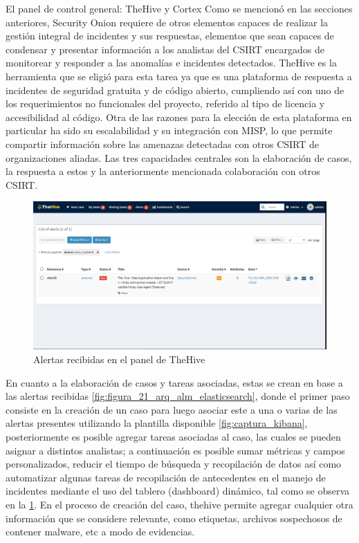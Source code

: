    \begin{subsection}{El panel de control general: TheHive y Cortex}
     Como se mencionó en las secciones anteriores, Security Onion requiere de otros elementos capaces de realizar la gestión integral de incidentes y sus respuestas, elementos que sean capaces de condensar y presentar información a los analistas del CSIRT encargados de monitorear y responder a las anomalías e incidentes detectados.  TheHive es la herramienta que se eligió para esta tarea ya que es una plataforma de respuesta a incidentes de seguridad gratuita y de código abierto, cumpliendo así con uno de los requerimientos no funcionales del proyecto, referido al tipo de licencia y accesibilidad al código. Otra de las razones para la elección de esta plataforma en particular ha sido su escalabilidad y su integración con MISP, lo que permite compartir información sobre las amenazas detectadas con otros CSIRT de organizaciones aliadas. Las tres capacidades centrales son la elaboración de casos, la respuesta a estos y la anteriormente mencionada colaboración con otros CSIRT.\par
     \begin{figure}[H]
        \centering
        \includegraphics[width=1\textwidth]{./iteracion_1_imagenes/figura_23_alerta_panel_thehive.png}
        \caption{ Alertas recibidas en el panel de TheHive\cite{thehive}}
        \label{fig:alerta_panel_thehive}
     \end{figure}
        \FloatBarrier
        En cuanto a la elaboración de casos y tareas asociadas, estas se crean en base a las alertas recibidas \ref{fig:figura_21_arq_alm_elasticsearch}, donde el primer paso consiste en la creación de un caso para luego asociar este a una o varias de las alertas presentes utilizando la plantilla disponible \ref{fig:captura_kibana}, posteriormente es posible agregar tareas asociadas al caso, las cuales se pueden asignar a distintos analistas; a continuación es posible sumar métricas y campos personalizados, reducir el tiempo de búsqueda y recopilación de datos así como automatizar algunas tareas de recopilación de antecedentes en el manejo de incidentes mediante el uso del tablero (dashboard) dinámico, tal como se observa en la \ref{fig:alerta_panel_thehive}. En el proceso de creación del caso, thehive permite agregar cualquier otra información que se considere relevante, como etiquetas, archivos sospechosos de contener malware, etc a modo de evidencias.

\end{subsection}
